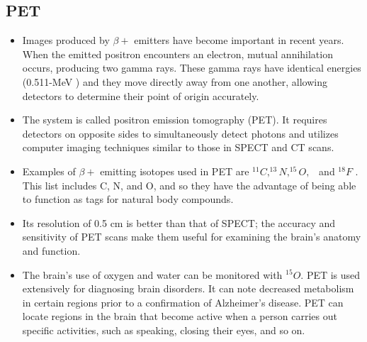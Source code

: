 \documentclass[12pt]{book}
\begin{document}
\subsection{PET}
\begin{itemize}
	\item Images produced by $\beta + $ emitters have become important in recent years. When the emitted positron encounters an electron, mutual annihilation occurs, producing two gamma rays.
	    These gamma rays have identical  energies (0.511-MeV )
	    and they move directly away from one another, allowing detectors to determine their point of origin accurately.
	\item The system is called positron emission tomography (PET). It requires detectors on opposite sides to simultaneously  detect photons and utilizes computer imaging techniques similar to those in SPECT and CT scans.

	\item  Examples of  $\beta + $ emitting isotopes used in PET are $^{11}C, ^{13}N, ^{15}O, $ \ and $ ^{18}F$ . This list includes C, N, and O, and so they have the advantage of being able to function as tags for natural body compounds.

	\item Its resolution of 0.5 cm is better than that of SPECT; the accuracy and sensitivity of PET scans make them useful for examining the brain’s anatomy and function.
	\item  The brain’s use of oxygen and water can be monitored with $^{15}O$. PET is used extensively for diagnosing brain disorders. It can note decreased metabolism in certain regions prior to a confirmation of Alzheimer’s disease. PET can locate regions in the brain that become active when a person carries out specific activities, such as speaking, closing their eyes, and so on.
\end{itemize}
\end{document}
